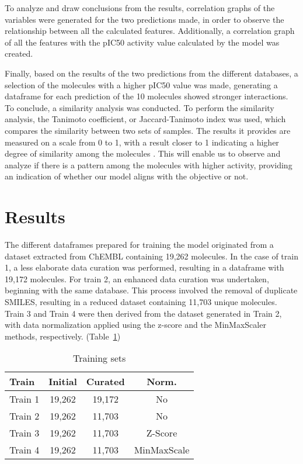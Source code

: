 \documentclass[final,times,twocolumn,article]{elsarticle}
\begin{document}
To analyze and draw conclusions from the results, correlation graphs of the variables were generated for the two predictions made, in order to observe the relationship between all the calculated features. Additionally, a correlation graph of all the features with the pIC50 activity value calculated by the model was created. 

Finally, based on the results of the two predictions from the different databases, a selection of the molecules with a higher pIC50 value was made, generating a dataframe for each prediction of the 10 molecules showed stronger interactions. To conclude, a similarity analysis was conducted. To perform the similarity analysis, the Tanimoto coefficient, or Jaccard-Tanimoto index was used, which compares the similarity between two sets of samples. The results it provides are measured on a scale from 0 to 1, with a result closer to 1 indicating a higher degree of similarity among the molecules \cite{Bajusz2015}. This will enable us to observe and analyze if there is a pattern among the molecules with higher activity, providing an indication of whether our model aligns with the objective or not. 

\section{Results}

The different dataframes prepared for training the model originated from a dataset extracted from ChEMBL containing 19,262 molecules. In the case of train 1, a less elaborate data curation was performed, resulting in a dataframe with 19,172 molecules. For train 2, an enhanced data curation was undertaken, beginning with the same database. This process involved the removal of duplicate SMILES, resulting in a reduced dataset containing 11,703 unique molecules. Train 3 and Train 4 were then derived from the dataset generated in Train 2, with data normalization applied using the z-score and the MinMaxScaler methods, respectively. (Table~\ref{Table1})

\begin{table}[ht]
\centering
\begin{tabular}{l c c c} 
     \hline
     Train & Initial & Curated & Norm.\\ 
     \hline
     Train 1 & 19,262 & 19,172 & No\\
     \hline
     Train 2 & 19,262 & 11,703 & No \\
     \hline
     Train 3 & 19,262 & 11,703 & Z-Score\\ 
     \hline
     Train 4 & 19,262 & 11,703 & MinMaxScale\\ 
     \hline
    \end{tabular}
\caption{Training sets}
\label{Table1}
\end{table}
\end{document}
